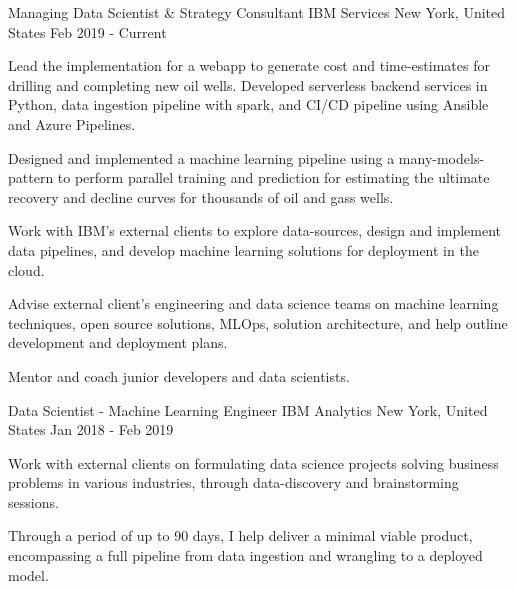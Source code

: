 

\begin{cventries}

  \cventry
    {Managing Data Scientist \& Strategy Consultant} %
    {IBM Services}
    {New York, United States} %
    {Feb 2019 - Current} %
    {
      \begin{cvitems} %
        \item {Lead the implementation for a webapp to generate cost and time-estimates for drilling and completing new oil wells. Developed serverless backend services in Python, data ingestion pipeline with spark, and CI/CD pipeline using Ansible and Azure Pipelines.}
        \item {Designed and implemented a machine learning pipeline using a many-models-pattern to perform parallel training and prediction for estimating the ultimate recovery and decline curves for thousands of oil and gass wells.}
        \item {Work with IBM's external clients to explore data-sources, design and implement data pipelines, and develop machine learning solutions for deployment in the cloud.}
        \item {Advise external client's engineering and data science teams on machine learning techniques, open source solutions, MLOps, solution architecture, and help outline development and deployment plans.}
        \item {Mentor and coach junior developers and data scientists.}
      \end{cvitems}
    }

  \cventry
    {Data Scientist - Machine Learning Engineer} %
    {IBM Analytics} %
    {New York, United States} %
    {Jan 2018 - Feb 2019} %
    {
      \begin{cvitems} %
        \item {Work with external clients on formulating data science projects solving business problems in various industries, through data-discovery and brainstorming sessions.}
        \item {Through a period of up to 90 days, I help deliver a minimal viable product, encompassing a full pipeline from data ingestion and wrangling to a deployed model.}
      \end{cvitems}
    }


\end{cventries}
